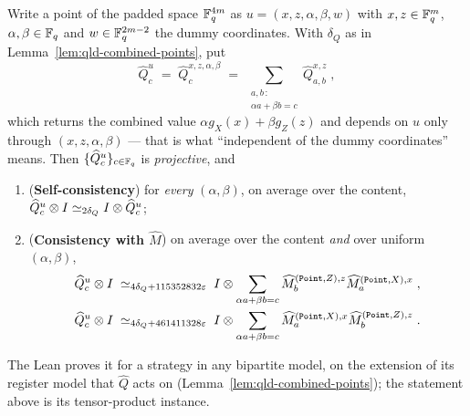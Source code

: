 \begin{lemma}
\label{lem:qld-padded-points}
\leanok
Write a point of the padded space $\mathbb{F}_q^{4m}$ as $u = (x, z, \alpha, \beta, w)$ with
$x, z \in \mathbb{F}_q^m$, $\alpha, \beta \in \mathbb{F}_q$ and $w \in \mathbb{F}_q^{2m - 2}$ the dummy coordinates.
With $\delta_Q$ as in Lemma~\ref{lem:qld-combined-points}, put
\begin{equation*}
  \widehat{Q}^u_c \;=\; \widehat{Q}^{x, z, \alpha, \beta}_c
    \;=\; \sum_{\substack{a, b \,:\\ \alpha a + \beta b = c}} \widehat{Q}^{x, z}_{a, b}\;,
\end{equation*}
which returns the combined value $\alpha g_X(x) + \beta g_Z(z)$ and depends on $u$ only through
$(x, z, \alpha, \beta)$ --- that is what ``independent of the dummy coordinates'' means. Then
$\{\widehat{Q}^{u}_c\}_{c \in \mathbb{F}_q}$ is \emph{projective}, and
\begin{enumerate}
\item (\textbf{Self-consistency}) for \emph{every} $(\alpha, \beta)$, on average over the
  content, $\widehat{Q}^{u}_c \otimes I \simeq_{2\delta_Q} I \otimes \widehat{Q}^{u}_c$;
\item (\textbf{Consistency with $\widehat{M}$}) on average over the content \emph{and} over
  uniform $(\alpha, \beta)$,
  \begin{gather*}
    \widehat{Q}^{u}_c \otimes I \;\simeq_{4\delta_Q + 115352832\varepsilon}\;
      I \otimes \sum_{\alpha a + \beta b = c} \widehat{M}^{(\mathtt{Point}, Z), z}_b
        \widehat{M}^{(\mathtt{Point}, X), x}_a\;, \\
    \widehat{Q}^{u}_c \otimes I \;\simeq_{4\delta_Q + 461411328\varepsilon}\;
      I \otimes \sum_{\alpha a + \beta b = c} \widehat{M}^{(\mathtt{Point}, X), x}_a
        \widehat{M}^{(\mathtt{Point}, Z), z}_b\;.
  \end{gather*}
\end{enumerate}
The Lean proves it for a strategy in any bipartite model, on the extension of its register model
that $\widehat{Q}$ acts on (Lemma~\ref{lem:qld-combined-points}); the statement above is its
tensor-product instance.
\end{lemma}

